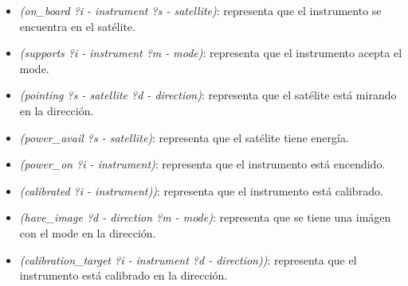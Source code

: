 \documentclass{uc3mpracticas}
\begin{document}
  \begin{itemize}
    \item \textit{(on\_board ?i - instrument ?s - satellite)}: representa que el instrumento se encuentra en el satélite.
    \item \textit{(supports ?i - instrument ?m - mode)}: representa que el instrumento acepta el mode.
    \item \textit{(pointing ?s - satellite ?d - direction)}: representa que el satélite está mirando en la dirección.
    \item \textit{(power\_avail ?s - satellite)}: representa que el satélite tiene energía.
    \item \textit{(power\_on ?i - instrument)}: representa que el instrumento está encendido.
    \item \textit{(calibrated ?i - instrument))}: representa que el instrumento está calibrado.
    \item \textit{(have\_image ?d - direction ?m - mode)}: representa que se tiene una imágen con el mode en la dirección.
    \item \textit{(calibration\_target ?i - instrument ?d - direction))}: representa que el instrumento está calibrado en la dirección.
  \end{itemize}
\end{document}
